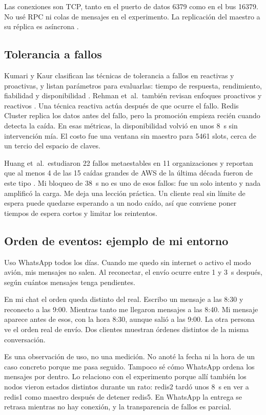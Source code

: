 \documentclass[11pt,a4paper]{article}
\begin{document}
Las conexiones son TCP, tanto en el puerto de datos 6379 como en el bus 16379. No usé RPC ni colas de mensajes en el experimento. La replicación del maestro a su réplica es asíncrona \cite{redis2026clusterspec}.

\subsection{Tolerancia a fallos}

Kumari y Kaur clasifican las técnicas de tolerancia a fallos en reactivas y proactivas, y listan parámetros para evaluarlas: tiempo de respuesta, rendimiento, fiabilidad y disponibilidad \cite{kumari2021survey}. Rehman et~al.\ también revisan enfoques proactivos y reactivos \cite{rehman2022fault}. Una técnica reactiva actúa después de que ocurre el fallo. Redis Cluster replica los datos antes del fallo, pero la promoción empieza recién cuando detecta la caída. En esas métricas, la disponibilidad volvió en unos 8~s sin intervención mía. El costo fue una ventana sin maestro para 5461 slots, cerca de un tercio del espacio de claves.

Huang et~al.\ estudiaron 22 fallos metaestables en 11 organizaciones y reportan que al menos 4 de las 15 caídas grandes de AWS de la última década fueron de este tipo \cite{huang2022metastable}. Mi bloqueo de 38~s no es uno de esos fallos: fue un solo intento y nada amplificó la carga. Me deja una lección práctica. Un cliente real sin límite de espera puede quedarse esperando a un nodo caído, así que conviene poner tiempos de espera cortos y limitar los reintentos.

\subsection{Orden de eventos: ejemplo de mi entorno}

Uso WhatsApp todos los días. Cuando me quedo sin internet o activo el modo avión, mis mensajes no salen. Al reconectar, el envío ocurre entre 1 y 3~s después, según cuántos mensajes tenga pendientes.

En mi chat el orden queda distinto del real. Escribo un mensaje a las 8:30 y reconecto a las 9:00. Mientras tanto me llegaron mensajes a las 8:40. Mi mensaje aparece antes de esos, con la hora 8:30, aunque salió a las 9:00. La otra persona ve el orden real de envío. Dos clientes muestran órdenes distintos de la misma conversación.

Es una observación de uso, no una medición. No anoté la fecha ni la hora de un caso concreto porque me pasa seguido. Tampoco sé cómo WhatsApp ordena los mensajes por dentro. Lo relaciono con el experimento porque allí también los nodos vieron estados distintos durante un rato: redis2 tardó unos 8~s en ver a redis1 como maestro después de detener redis5. En WhatsApp la entrega se retrasa mientras no hay conexión, y la transparencia de fallos es parcial.
\end{document}
